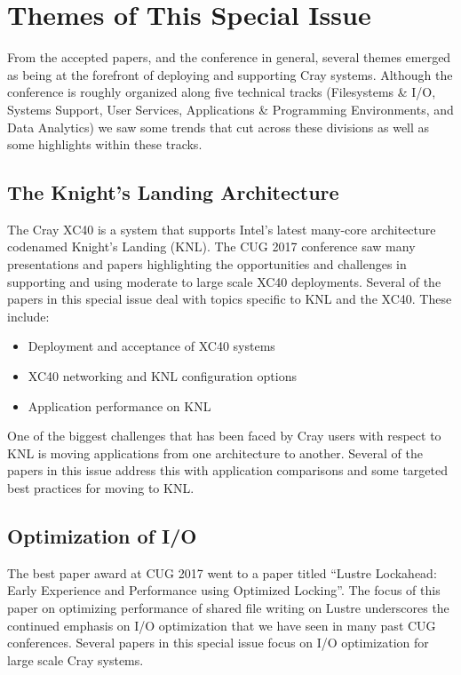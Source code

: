 \documentclass[AMA,LATO1COL,demo]{WileyNJD-v2}
\begin{document}
\keywords{}

\maketitle

\section{Themes of This Special Issue}\label{sec:themes}

From the accepted papers, and the conference in general, several themes emerged as being
at the forefront of deploying and supporting Cray systems. Although the conference is
roughly organized along five technical tracks (Filesystems \& I/O, Systems Support, User
Services, Applications \& Programming Environments, and Data Analytics) we saw some trends
that cut across these divisions as well as some highlights within these tracks.

\subsection{The Knight's Landing Architecture}\label{sec:knl}

The Cray XC40 is a system that supports Intel's latest many-core architecture codenamed Knight's Landing (KNL). The CUG 2017 conference saw many presentations and papers highlighting the opportunities and challenges in supporting and using moderate to large scale XC40 deployments. Several of the papers in this special issue deal with topics specific to KNL and the XC40. These include:
\begin{itemize}
  \item Deployment and acceptance of XC40 systems
  \item XC40 networking and KNL configuration options
  \item Application performance on KNL
\end{itemize}
One of the biggest challenges that has been faced by Cray users with respect to KNL is moving applications from one architecture to another. Several of the papers in this issue address this with application comparisons and some targeted best practices for moving to KNL.

\subsection{Optimization of I/O}\label{sec:io}

The best paper award at CUG 2017 went to a paper titled ``Lustre Lockahead: Early Experience and Performance using Optimized Locking''. The focus of this paper on optimizing performance of shared file writing on Lustre underscores the continued emphasis on I/O optimization that we have seen in many past CUG conferences. Several papers in this special issue focus on I/O optimization for large scale Cray systems.
\end{document}
